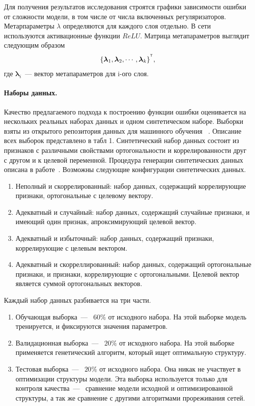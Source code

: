 \documentclass[12pt, twoside]{article}
\newcommand{\T}{^{\text{\tiny\sffamily\upshape\mdseries T}}}
\begin{document}
Для получения результатов исследования строятся графики зависимости ошибки от сложности модели, в том числе от числа включенных регуляризаторов. Метарпараметры $\lambda$ определяются для каждого слоя отдельно.
В сети используются активационные функции $ReLU$. Матрица метапараметров выглядит следующим образом
\[\{\boldsymbol{\lambda}_1, \boldsymbol{\lambda}_2,\cdots,  \boldsymbol{\lambda}_{k}\}^{\T},\]
где $\boldsymbol{\lambda}_i$~--- вектор метапараметров для i-ого слоя.

\paragraph{Наборы данных.}
Качество предлагаемого подхода к построению функции ошибки оценивается на нескольких реальных наборах данных и одном синтетическом наборе. Выборки взяты из открытого репозитория данных для машинного обучения ~\cite{seventh}.  Описание всех выборок представлено в табл 1. Синтетический набор данных состоит из признаков с различными свойствами ортогональности и коррелированности друг с другом и к целевой переменной. Процедура генерации синтетических данных описана в работе~\cite{katrutsa2015stress}. Возможны следующие конфигурации синтетических данных.
 \begin{enumerate}
 \item  Неполный и скоррелированный: набор данных, содержащий коррелирующие признаки, ортогональные с целевому вектору.
 \item  Адекватный и случайный: набор данных, содержащий случайные признаки, и имеющий один признак, апроксимирующий целевой вектор.
 \item Адекватный и избыточный: набор данных, содержащий признаки, коррелирующие с целевым вектором.
 \item Адекватный и скорреллированный: набор данных, содержащий ортогональные признаки, и признаки, коррелирующие с ортогональными. Целевой вектор является суммой ортогональных векторов.
 \end{enumerate}
Каждый набор данных разбивается на три части.
\begin{enumerate}
 \item  Обучающая выборка~---~ $60\%$ от исходного набора. На этой выборке модель тренируется, и фиксируются значения параметров. 
 \item  Валидационная выборка~---~ $20\%$ от исходного набора. На этой выборке применяется генетический алгоритм, который ищет оптимальную структуру.
 \item Тестовая выборка~---~ $20\%$ от исходного набора. Она никак не участвует в оптимизации структуры модели. Эта выборка используется только для контроля качества~---~ сравнение модели исходной и оптимизированной структуры, а так же сравнение с другими алгоритмами прореживания сетей. 
 \end{enumerate}
\end{document}
